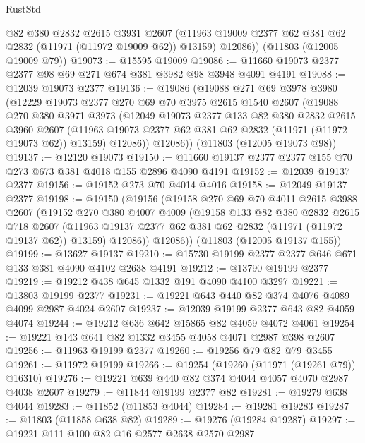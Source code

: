 \begin{lexlean}{RustStd}
\begin{coremodule}
        @82
        @380
        @2832
        @2615
        @3931
        @2607
        (@11963 @19009 @2377 @62 @381 @62 @2832 (@11971 (@11972 @19009 @62)) @13159)
        @12086))
    (@11803 (@12005 @19009 @79))
@19073 := @15595 @19009
@19086 := @11660 @19073 @2377 @2377 @98 @69 @271 @674 @381 @3982 @98 @3948 @4091 @4191
@19088 := @12039 @19073 @2377
@19136 := @19086
    (@19088
      @271
      @69
      @3978
      @3980
      (@12229
        @19073
        @2377
        @270
        @69
        @70
        @3975
        @2615
        @1540
        @2607
        (@19088
          @270
          @380
          @3971
          @3973
          (@12049
            @19073
            @2377
            @133
            @82
            @380
            @2832
            @2615
            @3960
            @2607
            (@11963 @19073 @2377 @62 @381 @62 @2832 (@11971 (@11972 @19073 @62)) @13159)
            @12086))
        @12086))
    (@11803 (@12005 @19073 @98))
@19137 := @12120 @19073
@19150 := @11660 @19137 @2377 @2377 @155 @70 @273 @673 @381 @4018 @155 @2896 @4090 @4191
@19152 := @12039 @19137 @2377
@19156 := @19152 @273 @70 @4014 @4016
@19158 := @12049 @19137 @2377
@19198 := @19150
    (@19156
      (@19158
        @270
        @69
        @70
        @4011
        @2615
        @3988
        @2607
        (@19152
          @270
          @380
          @4007
          @4009
          (@19158
            @133
            @82
            @380
            @2832
            @2615
            @718
            @2607
            (@11963 @19137 @2377 @62 @381 @62 @2832 (@11971 (@11972 @19137 @62)) @13159)
            @12086))
        @12086))
    (@11803 (@12005 @19137 @155))
@19199 := @13627 @19137
@19210 := @15730 @19199 @2377 @2377 @646 @671 @133 @381 @4090 @4102 @2638 @4191
@19212 := @13790 @19199 @2377
@19219 := @19212 @438 @645 @1332 @191 @4090 @4100 @3297
@19221 := @13803 @19199 @2377
@19231 := @19221 @643 @440 @82 @374 @4076 @4089 @4099 @2987 @4024 @2607
@19237 := @12039 @19199 @2377 @643 @82 @4059 @4074
@19244 := @19212 @636 @642 @15865 @82 @4059 @4072 @4061
@19254 := @19221 @143 @641 @82 @1332 @3455 @4058 @4071 @2987 @398 @2607
@19256 := @11963 @19199 @2377
@19260 := @19256 @79 @82 @79 @3455
@19261 := @11972 @19199
@19266 := @19254 (@19260 (@11971 (@19261 @79)) @16310)
@19276 := @19221 @639 @440 @82 @374 @4044 @4057 @4070 @2987 @4038 @2607
@19279 := @11844 @19199 @2377 @82
@19281 := @19279 @638 @4044
@19283 := @11852 (@11853 @4044)
@19284 := @19281 @19283
@19287 := @11803 (@11858 @638 @82)
@19289 := @19276 (@19284 @19287)
@19297 := @19221 @111 @100 @82 @16 @2577 @2638 @2570 @2987

\end{coremodule}
\end{lexlean}
